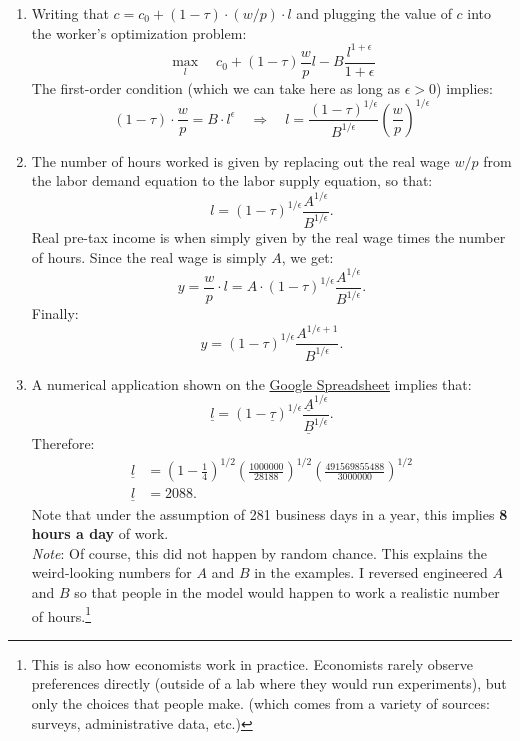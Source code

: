 \documentclass[]{book}
\let\rmarkdownfootnote\footnote%
\def\footnote{\protect\rmarkdownfootnote}
\begin{document}
\begin{enumerate}
\def\labelenumi{\arabic{enumi}.}
\setcounter{enumi}{1}
\item
  Writing that \(c=c_0+(1-\tau)\cdot (w/p) \cdot l\) and plugging the
  value of \(c\) into the worker's optimization problem:
  \[\max_l \quad c_0 +(1-\tau)\frac{w}{p}l -B\frac{l^{1+\epsilon}}{1+\epsilon}\]
  The first-order condition (which we can take here as long as
  \(\epsilon>0\)) implies:
  \[(1-\tau) \cdot \frac{w}{p} = B\cdot l^{\epsilon} \quad \Rightarrow \quad \boxed{l = \frac{(1-\tau)^{1/\epsilon}}{B^{1/\epsilon}}\left(\frac{w}{p}\right)^{1/\epsilon}}\]
\item
  The number of hours worked is given by replacing out the real wage
  \(w/p\) from the labor demand equation to the labor supply equation,
  so that:
  \[\boxed{l = (1-\tau)^{1/\epsilon}\frac{A^{1/\epsilon}}{B^{1/\epsilon}}}.\]
  Real pre-tax income is when simply given by the real wage times the
  number of hours. Since the real wage is simply \(A\), we get:
  \[y = \frac{w}{p} \cdot l = A\cdot(1-\tau)^{1/\epsilon}\frac{A^{1/\epsilon}}{B^{1/\epsilon}}.\]
  Finally:
  \[\boxed{y = (1-\tau)^{1/\epsilon}\frac{A^{1/\epsilon+1}}{B^{1/\epsilon}}}.\]
\item
  A numerical application shown on the
  \href{https://docs.google.com/spreadsheets/d/1faC3VTuXmo7wo4njkO2ERytzlJmbMgcckVj9ag_Mn6s/edit?usp=sharing}{Google
  Spreadsheet} implies that:
  \[\underline{l}=(1-\underline{\tau})^{1/\epsilon}\frac{\underline{A}^{1/\epsilon}}{\underline{B}^{1/\epsilon}}.\]
  Therefore: \[
  \begin{aligned}
  \underline{l}&=\left(1-\frac{1}{4}\right)^{1/2}\left(\frac{1000000}{28188}\right)^{1/2}\left(\frac{491569855488}{3000000}\right)^{1/2}\\
  \underline{l}&=2088.
  \end{aligned}
  \] Note that under the assumption of 281 business days in a year, this
  implies \textbf{8 hours a day} of work.\\
  \emph{Note}: Of course, this did not happen by random chance. This
  explains the weird-looking numbers for \(A\) and \(B\) in the
  examples. I reversed engineered \(A\) and \(B\) so that people in the
  model would happen to work a realistic number of hours.\footnote{This
    is also how economists work in practice. Economists rarely observe
    preferences directly (outside of a lab where they would run
    experiments), but only the choices that people make. (which comes
    from a variety of sources: surveys, administrative data, etc.)
}
\end{enumerate}
\end{document}

